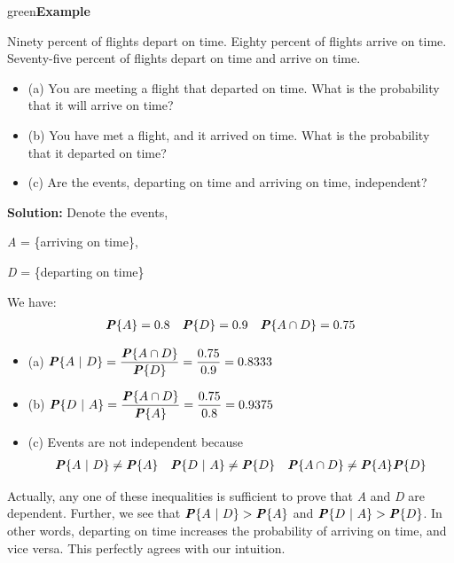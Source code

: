 \documentclass{article}
\newcounter{example}
\newenvironment{example}[1]{\begin{mybox}{green}{\refstepcounter{example}\textbf{Example~\theexample #1}}}{\end{mybox}}
\begin{document}
\begin{example}{}

Ninety percent of flights depart on time. Eighty percent of flights arrive
on time. Seventy-five percent of flights depart on time and arrive on time.
\begin{itemize}
    \item (a) You are meeting a flight that departed on time. What is the probability that it will arrive on time?
    \item (b) You have met a flight, and it arrived on time. What is the probability that it departed on time?
    \item (c) Are the events, departing on time and arriving on time, independent?
\end{itemize}

\textbf{Solution:} 
Denote the events,

\textit{A} = \{arriving on time\},  

\textit{D} = \{departing on time\}

We have:
\begin{align*}
    &\textbf{\textit{P}}\{A\} = 0.8 &\textbf{\textit{P}}\{D\} = 0.9& &\textbf{\textit{P}}\{A \cap D\} = 0.75
\end{align*}
\begin{itemize}
    \item (a) $\textbf{\textit{P}}\{A\ |\ D\} = \dfrac{\textbf{\textit{P}}\{A \cap D\}}{\textbf{\textit{P}}\{D\}} = \dfrac{0.75}{0.9} = 0.8333$
    \item (b) $\textbf{\textit{P}}\{D\ |\ A\} = \dfrac{\textbf{\textit{P}}\{A \cap D\}}{\textbf{\textit{P}}\{A\}} =\dfrac{0.75}{0.8} = 0.9375$
    \item (c) Events are not independent because
        \begin{align*}
            &\textbf{\textit{P}}\{A\ |\ D\} \neq \textbf{\textit{P}}\{A\} &\textbf{\textit{P}}\{D\ |\ A\} \neq \textbf{\textit{P}}\{D\}& &\textbf{\textit{P}}\{A \cap D\} \neq \textbf{\textit{P}}\{A\} \textbf{\textit{P}}\{D\}
        \end{align*}
\end{itemize}
Actually, any one of these inequalities is sufficient to prove that \textit{A} and \textit{D} are dependent. Further, we see that $\textbf{\textit{P}}\{A\ |\ D\} > \textbf{\textit{P}}\{A\}$ and $\textbf{\textit{P}}\{D\ |\ A\} > \textbf{\textit{P}}\{D\}$. In other words, departing on time increases the probability of arriving on time, and vice versa. This perfectly agrees with our intuition.
\end{example}
\end{document}
